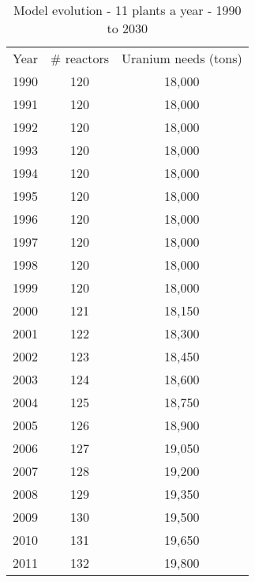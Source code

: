 {\tiny
\begin{table}[]
\centering
\caption{Model evolution - 11 plants a year - 1990 to 2030}
\label{my-label}
\begin{tabular}{ccc}
\multicolumn{1}{c}{Year} & \# reactors & Uranium needs (tons) \\
1990                     & 120         & 18,000               \\
1991                     & 120         & 18,000               \\
1992                     & 120         & 18,000               \\
1993                     & 120         & 18,000               \\
1994                     & 120         & 18,000               \\
1995                     & 120         & 18,000               \\
1996                     & 120         & 18,000               \\
1997                     & 120         & 18,000               \\
1998                     & 120         & 18,000               \\
1999                     & 120         & 18,000               \\
2000                     & 121         & 18,150               \\
2001                     & 122         & 18,300               \\
2002                     & 123         & 18,450               \\
2003                     & 124         & 18,600               \\
2004                     & 125         & 18,750               \\
2005                     & 126         & 18,900               \\
2006                     & 127         & 19,050               \\
2007                     & 128         & 19,200               \\
2008                     & 129         & 19,350               \\
2009                     & 130         & 19,500               \\
2010                     & 131         & 19,650               \\
2011                     & 132         & 19,800               \\

\end{tabular}
\end{table}}
